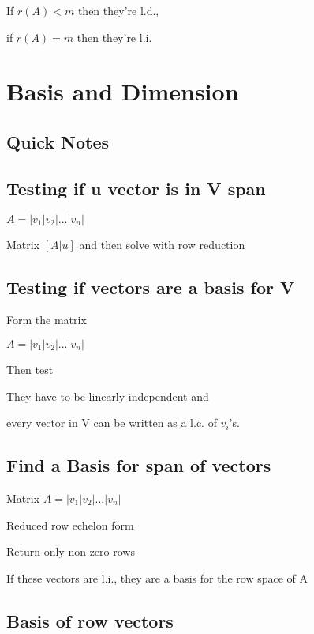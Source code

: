 \documentclass{extarticle}
\begin{document}
\begin{multicols}{4}
\begin{tcolorbox}[enhanced jigsaw,sharp corners,coltext=black,colback=Green!25!white,boxrule=0pt,breakable,size=minimal]
If $r(A) < m$ then they're l.d.,

if $r(A) = m$ then they're l.i.
\end{tcolorbox}








\section{Basis and Dimension}
\subsection{Quick Notes}
\subsection{Testing if u vector is in V span}

$A = \left|v_1|v_2|...|v_n\right|$

Matrix $[A|u]$ and then solve with row reduction


\subsection{Testing if vectors are a basis for V}

Form the matrix

$A = \left|v_1|v_2|...|v_n\right|$

Then test

They have to be linearly independent and 

every vector in V can be written as a l.c. of $v_i$'s.





\subsection{Find a Basis for span of vectors}

Matrix $A = \left|v_1|v_2|...|v_n\right|$

Reduced row echelon form

Return only non zero rows

If these vectors are l.i., they are a basis for the row space of A





\subsection{Basis of row vectors}


\end{multicols}
\end{document}
